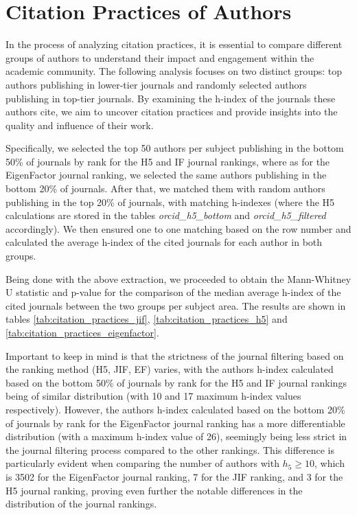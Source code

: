 \section{Citation Practices of Authors}

In the process of analyzing citation practices, it is essential to compare
different groups of authors to understand their impact and engagement within
the academic community. The following analysis focuses on two distinct groups:
top authors publishing in lower-tier journals and randomly selected authors
publishing in top-tier journals. By examining the h-index of the journals these
authors cite, we aim to uncover citation practices and provide insights into
the quality and influence of their work.

Specifically, we selected the top 50 authors per subject publishing in the
bottom 50\% of journals by rank for the H5 and IF journal rankings, where as
for the EigenFactor journal ranking, we selected the same authors publishing in
the bottom 20\% of journals. After that, we matched them with random authors
publishing in the top 20\% of journals, with matching h-indexes (where the H5
calculations are stored in the tables \emph{orcid\_h5\_bottom} and
\emph{orcid\_h5\_filtered} accordingly). We then ensured one to one matching
based on the row number and calculated the average h-index of the cited
journals for each author in both groups.

Being done with the above extraction, we proceeded to obtain the Mann-Whitney U
statistic and p-value for the comparison of the median average h-index of the
cited journals between the two groups per subject area. The results are shown
in tables \ref{tab:citation_practices_jif}, \ref{tab:citation_practices_h5} and
\ref{tab:citation_practices_eigenfactor}.

Important to keep in mind is that the strictness of the journal filtering based
on the ranking method (H5, JIF, EF) varies, with the authors h-index calculated
based on the bottom 50\% of journals by rank for the H5 and IF journal rankings
being of similar distribution (with 10 and 17 maximum h-index values
respectively). However, the authors h-index calculated based on the bottom 20\%
of journals by rank for the EigenFactor journal ranking has a more
differentiable distribution (with a maximum h-index value of 26), seemingly
being less strict in the journal filtering process compared to the other
rankings. This difference is particularly evident when comparing the number of
authors with $h_5 \geq 10$, which is 3502 for the EigenFactor journal ranking,
7 for the JIF ranking, and 3 for the H5 journal ranking, proving even further
the notable differences in the distribution of the journal rankings.

